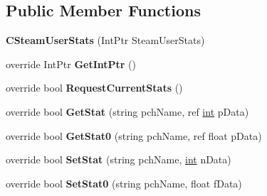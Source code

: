 \subsection*{Public Member Functions}
\begin{DoxyCompactItemize}
\item 
\hypertarget{classValve_1_1Steamworks_1_1CSteamUserStats_a3d7a2dc44129779645ca7718f7c9dfa7}{}{\bfseries C\+Steam\+User\+Stats} (Int\+Ptr Steam\+User\+Stats)\label{classValve_1_1Steamworks_1_1CSteamUserStats_a3d7a2dc44129779645ca7718f7c9dfa7}

\item 
\hypertarget{classValve_1_1Steamworks_1_1CSteamUserStats_acf36f04b6594d1d41cc06408e19beeb9}{}override Int\+Ptr {\bfseries Get\+Int\+Ptr} ()\label{classValve_1_1Steamworks_1_1CSteamUserStats_acf36f04b6594d1d41cc06408e19beeb9}

\item 
\hypertarget{classValve_1_1Steamworks_1_1CSteamUserStats_a7f61ffa33c5f438d92a91ff8d635f878}{}override bool {\bfseries Request\+Current\+Stats} ()\label{classValve_1_1Steamworks_1_1CSteamUserStats_a7f61ffa33c5f438d92a91ff8d635f878}

\item 
\hypertarget{classValve_1_1Steamworks_1_1CSteamUserStats_acf0c132ecbfe93fced204519b17796ed}{}override bool {\bfseries Get\+Stat} (string pch\+Name, ref \hyperlink{SDL__thread_8h_a6a64f9be4433e4de6e2f2f548cf3c08e}{int} p\+Data)\label{classValve_1_1Steamworks_1_1CSteamUserStats_acf0c132ecbfe93fced204519b17796ed}

\item 
\hypertarget{classValve_1_1Steamworks_1_1CSteamUserStats_a6dcba9a7412281f4bddbd39f64a64b14}{}override bool {\bfseries Get\+Stat0} (string pch\+Name, ref float p\+Data)\label{classValve_1_1Steamworks_1_1CSteamUserStats_a6dcba9a7412281f4bddbd39f64a64b14}

\item 
\hypertarget{classValve_1_1Steamworks_1_1CSteamUserStats_a6845b6bdc2dd71e808e1d824b86ce3e9}{}override bool {\bfseries Set\+Stat} (string pch\+Name, \hyperlink{SDL__thread_8h_a6a64f9be4433e4de6e2f2f548cf3c08e}{int} n\+Data)\label{classValve_1_1Steamworks_1_1CSteamUserStats_a6845b6bdc2dd71e808e1d824b86ce3e9}

\item 
\hypertarget{classValve_1_1Steamworks_1_1CSteamUserStats_a40b04a516b974e799957ae6d95f5a529}{}override bool {\bfseries Set\+Stat0} (string pch\+Name, float f\+Data)\label{classValve_1_1Steamworks_1_1CSteamUserStats_a40b04a516b974e799957ae6d95f5a529}


\end{DoxyCompactItemize}
